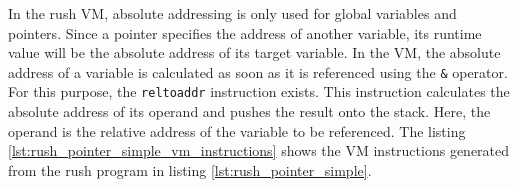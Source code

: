 
In the rush VM, absolute addressing is only used for global variables and pointers.
Since a pointer specifies the address of another variable, its runtime value will be the absolute address of its target variable.
In the VM, the absolute address of a variable is calculated as soon as it is referenced using the \texttt{\&} operator.
For this purpose, the \texttt{reltoaddr} instruction exists.
This instruction calculates the absolute address of its operand and pushes the result onto the stack.
Here, the operand is the relative address of the variable to be referenced.
The listing \ref{lst:rush_pointer_simple_vm_instructions} shows the VM instructions generated from the rush program in listing \ref{lst:rush_pointer_simple}.


